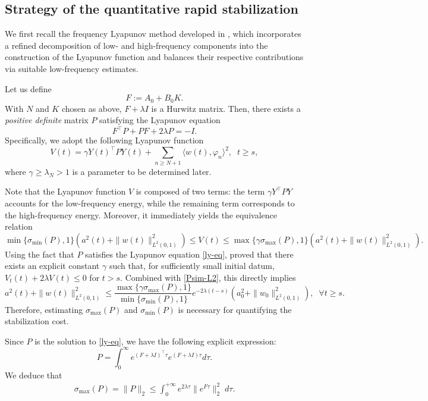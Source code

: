\documentclass[a4paper]{article}
\numberwithin{equation}{section}
\begin{document}
\subsection{Strategy of the quantitative rapid stabilization}
We first recall the frequency Lyapunov method developed in \cite{X,XZ}, which incorporates a refined decomposition of low- and high-frequency components into the construction of the Lyapunov function and balances their respective contributions via suitable low-frequency estimates. 

Let us define
\begin{equation}\label{F-DEF}F:=
	A_0+B_0 K.\end{equation} 
With $N$ and $K$ chosen as above, $F+\lambda  I$ is a Hurwitz matrix. Then, there exists a \textit{positive definite} matrix $P$ satisfying the Lyapunov equation
\begin{equation}\label{ly-eq}
	F^\top P+PF+2\lambda  P=-I.
\end{equation}
Specifically, we adopt the following Lyapunov function
\begin{equation}\label{Lyapunov}
V(t)= \gamma Y(t)^{\top} P Y(t)+\sum_{n\ge N+1} \langle w(t),\varphi_n\rangle^2,\;\;t\ge s,
\end{equation}
where $ \gamma\ge \lambda_N>1$ is a parameter to be determined later. 

Note that the Lyapunov function $V$ is composed of two terms: the term $\gamma Y^\top P Y$ accounts for the low-frequency energy, while the remaining term corresponds to the high-frequency energy. Moreover, it immediately yields the equivalence relation
\begin{equation} \label{Psim-L2}
\min\{\sigma_{\min}(P),1\}\left(a^2(t)+\|w(t)\|^2_{L^2(0,1)}\right)\le V(t)\le  \max\{\gamma\sigma_{\max}(P),1\}\left(a^2(t)+\|w(t)\|^2_{L^2(0,1)}\right).
 \end{equation}
Using the fact that $P$ satisfies the Lyapunov equation \eqref{ly-eq}, \cite{XZ} proved that there exists an explicit constant $\gamma$ such that, for sufficiently small initial datum, $V_t(t)+2\lambda V(t)\le 0$ for $t> s$. Combined with \eqref{Psim-L2}, this directly implies
$$a^2(t)+\|w(t)\|^2_{L^2(0,1)}\le \frac{\max\{\gamma\sigma_{\max}(P),1\}}{\min\{\sigma_{\min}(P),1\}}e^{-2\lambda (t-s)}\left(a^2_0+\|w_0\|^2_{L^2(0,1)}\right),\;\;\forall t\ge s.$$
Therefore, estimating $\sigma_{\max}(P)$ and $\sigma_{\min}(P)$ is necessary for quantifying the stabilization cost.

Since $P$ is the solution to \eqref{ly-eq}, we have the following explicit expression:
$$P=\int_0^{\infty}e^{(F+\lambda I)^{\top}\tau}e^{(F+\lambda I)\tau}d\tau.$$ We deduce that
\begin{equation}\label{P-max}
\begin{aligned}
		\sigma_{\max}(P)=\|P\|_2\le \int_0^{+\infty} e^{2\lambda \tau}\|e^{F\tau}\|_2^2\;d\tau.
\end{aligned}
\end{equation} 
\end{document}

